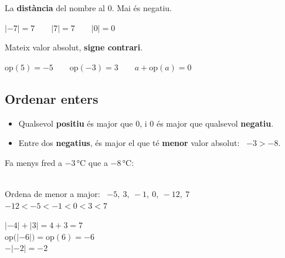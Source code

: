 \documentclass[11pt,a4paper]{article}
\begin{document}
\vfill
\begin{tcbraster}[raster columns=2,raster equal height,raster column skip=10pt]
\begin{tcolorbox}[fmbase,colback=fmdefbg,colframe=fmdef,coltitle=white,title={Valor absolut \ $|a|$}]
La \textbf{distància} del nombre al 0. Mai és negatiu.\par\smallskip
{\centering$|-7|=7\qquad |7|=7\qquad |0|=0$\par}
\end{tcolorbox}
\begin{tcolorbox}[fmbase,colback=fmdefbg,colframe=fmdef,coltitle=white,title={Oposat \ $\text{op}(a)=-a$}]
Mateix valor absolut, \textbf{signe contrari}.\par\smallskip
{\centering$\text{op}(5)=-5\qquad \text{op}(-3)=3\qquad a+\text{op}(a)=0$\par}
\end{tcolorbox}
\end{tcbraster}

\vfill
\subsection{Ordenar enters}
\begin{minipage}[t]{0.52\linewidth}
\begin{idea}
\begin{itemize}[leftmargin=1em]
\item Qualsevol \textbf{positiu} és major que 0, i 0 és major que qualsevol \textbf{negatiu}.
\item Entre dos \textbf{negatius}, és major el que té \textbf{menor} valor absolut: \ $-3>-8$.
\end{itemize}
\end{idea}
\end{minipage}\hfill
\begin{minipage}[t]{0.45\linewidth}
\begin{truc}
Fa menys fred a $-3$\,°C que a $-8$\,°C:\\[3pt]
\hspace*{1em}{\Large$-3>-8$} \ \ {\color{fmA}\Large\faThermometerQuarter}
\end{truc}
\end{minipage}

\vfill
\begin{exemple}[Exemples]
\begin{minipage}[t]{0.5\linewidth}
Ordena de menor a major: \ $-5,\ 3,\ -1,\ 0,\ -12,\ 7$\\[4pt]
{\large$-12<-5<-1<0<3<7$}
\end{minipage}\hfill
\begin{minipage}[t]{0.47\linewidth}
$|-4|+|3|=4+3=7$\\[3pt]
$\text{op}\big(|-6|\big)=\text{op}(6)=-6$\\[3pt]
$-|-2|=-2$
\end{minipage}
\end{exemple}
\end{document}

